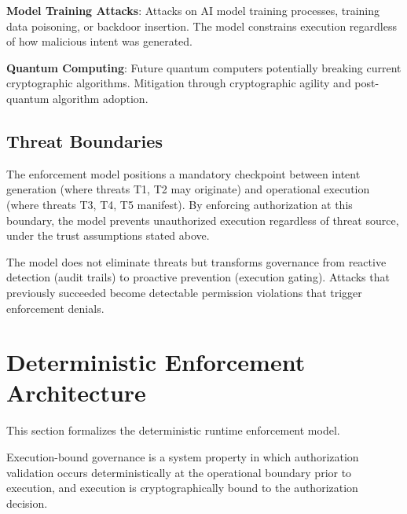 \documentclass[11pt,letterpaper]{article}
\begin{document}
\textbf{Model Training Attacks}: Attacks on AI model training processes, training data poisoning, or backdoor insertion. The model constrains execution regardless of how malicious intent was generated.

\textbf{Quantum Computing}: Future quantum computers potentially breaking current cryptographic algorithms. Mitigation through cryptographic agility and post-quantum algorithm adoption.

\subsection{Threat Boundaries}

The enforcement model positions a mandatory checkpoint between intent generation (where threats T1, T2 may originate) and operational execution (where threats T3, T4, T5 manifest). By enforcing authorization at this boundary, the model prevents unauthorized execution regardless of threat source, under the trust assumptions stated above.

The model does not eliminate threats but transforms governance from reactive detection (audit trails) to proactive prevention (execution gating). Attacks that previously succeeded become detectable permission violations that trigger enforcement denials.

\section{Deterministic Enforcement Architecture}
\label{sec:model}

This section formalizes the deterministic runtime enforcement model.

\begin{definition}
Execution-bound governance is a system property in which authorization validation occurs deterministically at the operational boundary prior to execution, and execution is cryptographically bound to the authorization decision.
\end{definition}
\end{document}
